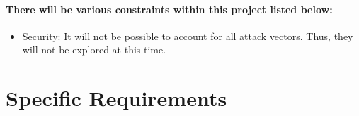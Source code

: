 \paragraph{There will be various constraints within this project listed below:}
\begin{itemize}
\item Security: It will not be possible to account for all attack vectors. Thus, they will not be explored at this time.
\end{itemize}




\section{Specific Requirements}

